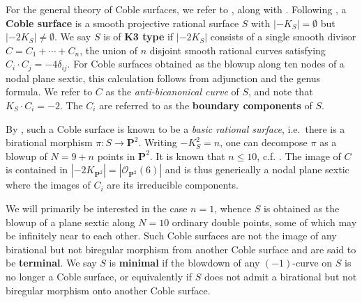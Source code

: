 \documentclass{amsart}
\begin{document}
\begin{remark}

For the general theory of Coble surfaces, we refer to \cite{EnriquesOne,EnriquesTwo}, along with \cite{DM19, DZ99, dolgachev2013the-rationality, CD89, CD12, Dol17}. Following \cite[\S 5.1]{DM19}, a \textbf{Coble surface} is a smooth projective rational surface \(S\) with \({\left\lvert {-K_S} \right\rvert} = \emptyset\) but \({\left\lvert {-2K_S} \right\rvert} \neq \emptyset\). We say \(S\) is of \textbf{K3 type} if \({\left\lvert {-2K_S} \right\rvert}\) consists of a single smooth divisor \(C = C_1 + \cdots + C_n\), the union of \(n\) disjoint smooth rational curves satisfying \(C_i\cdot C_j = -4\delta_{ij}\). For Coble surfaces obtained as the blowup along ten nodes of a nodal plane sextic, this calculation follows from adjunction and the genus formula. We refer to \(C\) as the \emph{anti-bicanonical curve} of \(S\), and note that \(K_S\cdot C_i = -2\). The \(C_i\) are referred to as the \textbf{boundary components} of \(S\).

By \cite[\S 5.1]{Dol17}, such a Coble surface is known to be a \emph{basic rational surface}, i.e.~there is a birational morphism \(\pi: S\to {\mathbf{P}}^2\). Writing \(-K_S^2 = n\), one can decompose \(\pi\) as a blowup of \(N = 9+n\) points in \({\mathbf{P}}^2\). It is known that \(n\leq 10\), c.f. \cite[Prop.\,9.1.5]{EnriquesTwo}. The image of \(C\) is contained in \({\left\lvert {-2K_{{\mathbf{P}}^2}} \right\rvert} = {\left\lvert {{\mathcal{O}}_{{\mathbf{P}}^2}(6)} \right\rvert}\) and is thus generically a nodal plane sextic where the images of \(C_i\) are its irreducible components.

We will primarily be interested in the case \(n=1\), whence \(S\) is obtained as the blowup of a plane sextic along \(N=10\) ordinary double points, some of which may be infinitely near to each other. Such Coble surfaces are not the image of any birational but not biregular morphism from another Coble surface and are said to be \textbf{terminal}. We say \(S\) is \textbf{minimal} if the blowdown of any \((-1)\)-curve on \(S\) is no longer a Coble surface, or equivalently if \(S\) does not admit a birational but not biregular morphism onto another Coble surface.

\end{remark}
\end{document}

